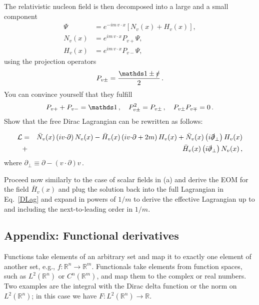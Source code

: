 \documentclass[11pt]{latex/exercise}
\begin{document}
\begin{itemize}

          The relativistic nucleon field is then decomposed into a large and a small component
          \begin{align}
              \Psi   & =e^{-im\,v\cdot x}\left[N_v(x)+H_v(x)\right],
              \\
              N_v(x) & =e^{im\,v\cdot x} P_{v+}\Psi,
              \\
              H_v(x) & =e^{im\,v\cdot x} P_{v-}\Psi,
          \end{align}
          using the projection operators
          \begin{equation}
              P_{v\pm}=\frac{\eins\pm\vs}{2}
              \,.
          \end{equation}
          You can convince yourself that they fulfill
          \begin{equation}
              P_{v+}+P_{v-}=\eins\,,\quad
              P_{v\pm}^2=P_{v\pm}\,,\quad
              P_{v\pm}P_{v\mp}=0\,.
          \end{equation}
          Show that the free Dirac Lagrangian can be rewritten as follows:

          \begin{eqnarray}
              \mathcal{L}
              &=&
              \bar N_v(x) \left( i v {\cdot} \partial \right) N_v(x) -  \bar H_v(x) \left( i v {\cdot} \partial + 2m  \right) H_v(x) +  \bar N_v(x) \left( i \slashed{\partial}_\perp \right) H_v(x)
              \nonumber
              \\
              &+& \bar H_v(x) \left(  i \slashed{\partial}_\perp  \right) N_v(x)\,,
              \label{DLag}
          \end{eqnarray}
          where $\partial_\perp \equiv \partial -  (v {\cdot} \partial) v$\,.
\end{itemize}
Proceed now similarly to the case of scalar fields in (a) and derive the EOM for the field $\bar H_v(x)$ and plug the solution back into the full Lagrangian in Eq.~\eqref{DLag} and expand in powers of
$1/m$ to derive the effective Lagrangian up to and including the next-to-leading order in $1/m$.


\subsection*{Appendix: Functional derivatives}
\label{A:1}
Functions take elements of an arbitrary set and map it to exactly one element of another set, e.g., $f\colon \mathbb{R}^n \rightarrow \mathbb{R}^m$.
Functionals take elements from function spaces, such as $L^2(\mathbb{R}^n)$ or $C^n(\mathbb{R}^m)$, and map them to the complex or real numbers.
Two examples are the integral with the Dirac delta function or the norm on $L^2(\mathbb{R}^n)$;
in this case we have $F\colon L^2(\mathbb{R}^n)\to \mathbb{R}$.
\end{document}
